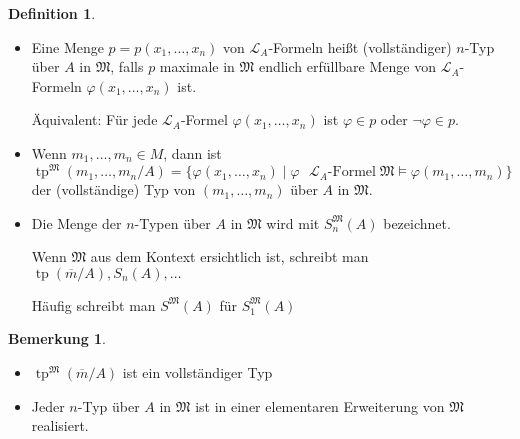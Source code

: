 \documentclass[12pt,parskip=full]{scrartcl}
\theoremstyle{definition}
\newtheorem{definition}[theorem]{Definition}
\newtheorem{remark}[theorem]{Bemerkung}
\begin{document}
 	\begin{definition}
 		\begin{itemize}
 			\item Eine Menge $p = p(x_1, \dots, x_n)$ von $\mathcal{L}_A$-Formeln heißt (vollständiger) $n$-Typ über $A$ in $\mathfrak{M}$, falls $p$ maximale in $\mathfrak{M}$ endlich erfüllbare Menge von $\mathcal{L}_A$-Formeln $\varphi(x_1, \dots, x_n)$ ist.
 			
 			Äquivalent: Für jede $\mathcal{L}_A$-Formel $\varphi(x_1, \dots, x_n)$ ist $\varphi \in p$ oder $\lnot \varphi \in p$.
 			\item Wenn $m_1, \dots, m_n \in M$, dann ist
 			\begin{equation*}
	 			\operatorname{tp}^\mathfrak{M}(m_1, \dots, m_n/A) = \{ \varphi(x_1, \dots, x_n) \mid \varphi \text{ $\mathcal{L}_A$-Formel} \; \mathfrak{M} \models \varphi(m_1, \dots, m_n) \}
 			\end{equation*}
 			der (vollständige) Typ von $(m_1, \dots, m_n)$ über $A$ in $\mathfrak{M}$.
 			\item Die Menge der $n$-Typen über $A$ in $\mathfrak{M}$ wird mit $S_n^\mathfrak{M}(A)$ bezeichnet.
 			
 			Wenn $\mathfrak{M}$ aus dem Kontext ersichtlich ist, schreibt man $\operatorname{tp}(\overline{m}/A), S_n(A), \dots$
 			
 			Häufig schreibt man $S^\mathfrak{M}(A)$ für $S_1^\mathfrak{M}(A)$
 		\end{itemize}
 	\end{definition}
 
 	\begin{remark}
 		\begin{itemize}
 			\item $\operatorname{tp}^\mathfrak{M}(\overline{m}/A)$ ist ein vollständiger Typ
 			\item Jeder $n$-Typ über $A$ in $\mathfrak{M}$ ist in einer elementaren Erweiterung von $\mathfrak{M}$ realisiert.
 		\end{itemize}
 	\end{remark}
 
\end{document}
